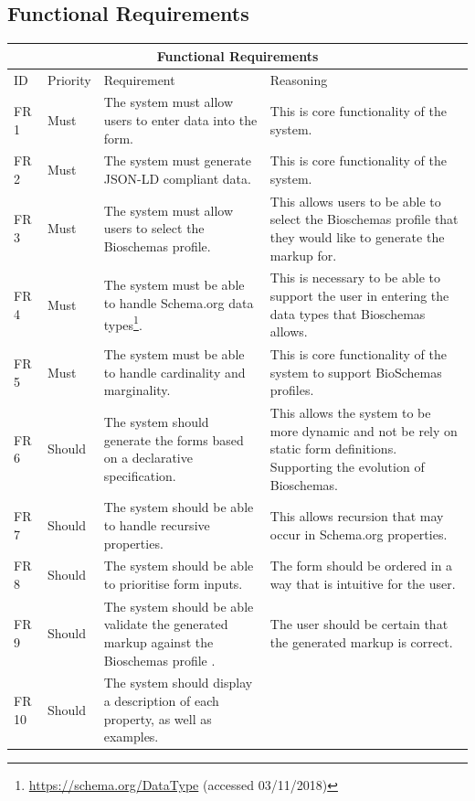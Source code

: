 \subsection{Functional Requirements}\label{sec:functionalReq}
{

\begin{longtable}{ |p{1.5cm}|p{1.75cm}|p{5cm}|p{5cm}|  }
 \hline
 \multicolumn{4}{|c|}{Functional Requirements} \\
 \hline
 ID & Priority &Requirement& Reasoning\\
 \hline
 FR 1   & Must & The system must allow users to enter data into the form. & 
 This is core functionality of the system.\\
 \hline
 FR 2   & Must & The system must generate JSON-LD compliant data.&
 This is core functionality of the system.\\
  \hline
 FR 3   & Must & The system must allow users to select the Bioschemas profile.&  
 This allows users to be able to select the Bioschemas profile that they would like to generate the markup for.\\
  \hline
 FR 4  & Must & The system must be able to handle Schema.org data types\footnote{\url{https://schema.org/DataType} (accessed 03/11/2018)}.& 
 This is necessary to be able to support the user in entering the data types that Bioschemas allows.\\
   \hline
 FR 5   & Must & The system must be able to handle cardinality and marginality.&
 This is core functionality of the system to support BioSchemas profiles.\\
   \hline
  FR 6   & Should & The system should generate the forms based on a declarative specification.&
 This allows the system to be more dynamic and not be rely on static form definitions. Supporting the evolution of Bioschemas.\\
  \hline
 FR 7   & Should  & The system should be able to handle recursive properties.&
 This allows recursion that may occur in Schema.org properties.\\
   \hline
 FR 8   & Should  & The system should be able to prioritise form inputs.&
 The form should be ordered in a way that is intuitive for the user.\\
   \hline
 FR 9   & Should  & The system should be able validate the generated markup against the Bioschemas profile .&
 The user should be certain that the generated markup is correct.\\
    \hline
 FR 10   & Should  & The system should display a description of each property, as well as examples.&

\end{longtable}}
